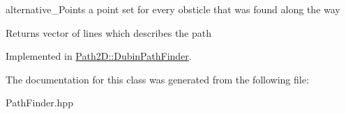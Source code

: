 \begin{DoxyItemize}
\item alternative\+\_\+\+Points a point set for every obsticle that was found along the way \begin{DoxyReturn}{Returns}
vector of lines which describes the path 
\end{DoxyReturn}
\end{DoxyItemize}


Implemented in \mbox{\hyperlink{class_path2_d_1_1_dubin_path_finder_a53d6ee86e364b403274f403af6e5088e}{Path2\+D\+::\+Dubin\+Path\+Finder}}.



The documentation for this class was generated from the following file\+:\begin{DoxyCompactItemize}
\item 
Path\+Finder.\+hpp\end{DoxyCompactItemize}
